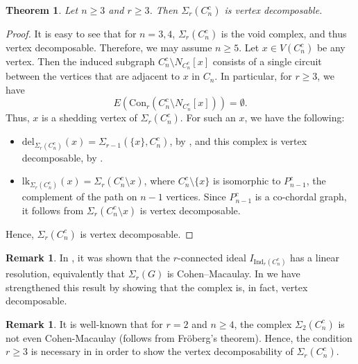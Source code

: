 \documentclass[12pt,reqno]{amsart}
\newtheorem{theorem}[proposition]{Theorem}
\theoremstyle{definition}
\newtheorem{remark}[proposition]{Remark}
\newcommand{\lk}{{\mathrm{lk}}}
\newcommand{\del}{{\mathrm{del}}}
\newcommand{\Con}{{\mathrm{Con}}}
\def\del{\mathrm{del}}
\begin{document}
	\begin{theorem}\label{cycle complement}
		Let $n \geq 3$ and $r \geq 3$. Then $\Sigma_r(C_n^{c})$ is vertex decomposable.
	\end{theorem}
	
	\begin{proof}
		It is easy to see that for $n=3,4$,  
		$\Sigma_r(C_n^{c})$ is the void complex, and thus vertex decomposable. Therefore, we may assume $n\ge 5$. Let $x \in V(C_n^{c})$ be any vertex. Then the induced subgraph $C_n^{c} \setminus N_{C_n^{c}}[x]$ consists of a single circuit between the vertices that are adjacent to $x$ in $C_n$. In particular, for $r \geq 3$, we have
		\[
		E(\Con_r(C_n^{c} \setminus N_{C_n^{c}}[x])) = \emptyset.
		\]
		Thus, $x$ is a shedding vertex of $\Sigma_r(C_n^{c})$. For such an $x$, we have the following:
		
		\begin{itemize}
			\item $\del_{\Sigma_r(C_n^c)}(x) = \Sigma_{r-1}(\{x\},C_n^c)$, by , and this complex is vertex decomposable, by .
			
			\item $\lk_{\Sigma_r(C_n^c)}(x) = \Sigma_r(C_n^c \setminus x)$, where $C_n^{c} \setminus \{x\}$ is isomorphic to $P_{n-1}^{c}$, the complement of the path on $n-1$ vertices. Since $P_{n-1}^{c}$ is a co-chordal graph, it follows from  $\Sigma_r(C_n^{c} \setminus x)$ is vertex decomposable.
		\end{itemize}
		
		Hence, $\Sigma_r(C_n^c)$ is vertex decomposable.
	\end{proof}
	
	\begin{remark}
		In \cite[Theorem 5.4]{FVDH}, it was shown that the $r$-connected ideal $I_{\mathrm{Ind}_r(C_n^c)}$ has a linear resolution, equivalently that $\Sigma_r(G)$ is Cohen–Macaulay. In  we have strengthened this result by showing that the complex is, in fact, vertex decomposable.
	\end{remark}
	\begin{remark}
		It is well-known that for $r=2$ and $n\ge 4$, the complex $\Sigma_2(C_n^{c})$ is not even Cohen-Macaulay (follows from Fr\"oberg's theorem). Hence, the condition $r\ge 3$ is necessary in  in order to show the vertex decomposability of $\Sigma_r(C_n^{c})$.
	\end{remark}
\end{document}
